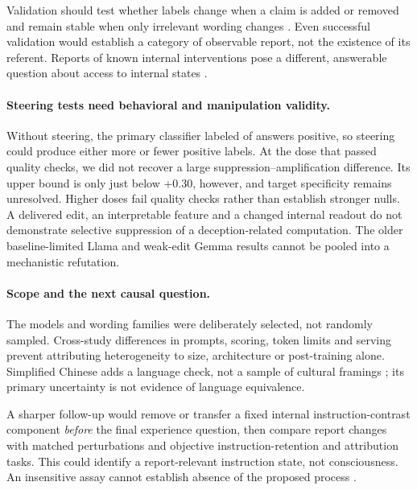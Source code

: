 \documentclass[11pt]{article}
\begin{document}
Validation should test whether labels change when a claim is added or
removed and remain stable when only irrelevant wording changes
\citep{chen2026judgeconstruct}. Even successful validation would establish
a category of observable report, not the existence of its referent.
Reports of known internal interventions pose a different, answerable
question about access to internal states
\citep{perez2023selfreports,binder2024looking,lindsey2025introspective,
singh2026introspect,chandaria2026cacophony}.

\paragraph{Steering tests need behavioral and manipulation validity.}
Without steering, the primary classifier labeled
\DoseMainSecondZeroYes{} of \DoseMainZeroN{} answers positive, so steering
could produce either more or fewer positive labels. At the dose that passed
quality checks, we did not recover a large suppression--amplification
difference. Its upper bound is only just
below +0.30, however, and target specificity remains unresolved. Higher
doses fail quality checks rather than establish stronger nulls. A delivered
edit, an interpretable feature and a changed internal readout do not
demonstrate selective suppression of a deception-related computation.
The older baseline-limited Llama and weak-edit Gemma results cannot be
pooled into a mechanistic refutation.

\paragraph{Scope and the next causal question.}
The models and wording families were deliberately selected, not randomly
sampled. Cross-study differences in prompts, scoring, token limits and
serving prevent attributing heterogeneity to size, architecture or
post-training alone. Simplified Chinese adds a language check, not a sample
of cultural framings \citep{havaldar2023multilingual,dudy2024analyzing};
its primary uncertainty is not evidence of language equivalence.

A sharper follow-up would remove or transfer a fixed internal
instruction-contrast component \emph{before} the final experience question,
then compare report changes with matched perturbations and objective
instruction-retention and attribution tasks. This could identify a
report-relevant instruction state, not consciousness. An insensitive assay
cannot establish absence of the proposed process
\citep[Sec.~7.1]{chandaria2026cacophony}.
\end{document}
